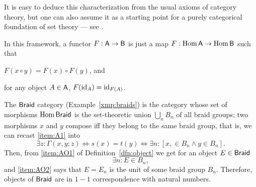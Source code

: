 It is easy to deduce this characterization from the usual axioms of
category theory, but one can also assume it as a starting point for a
purely categorical foundation of set theory --- see
\cite{lawvere;1965}. 

In this framework, a functor $F: \mathsf{A} \to \mathsf{B}$ is just a map $F:
\operatorname{Hom}\mathsf{A} \to \operatorname{Hom}\mathsf{B}$ such that
\begin{inparaenum}
\item $F(x \circ y) = F(x) \circ F(y)$, and
\item for any object $A \in \mathsf{A}$, $F(\operatorname{id}_A) = \operatorname{id}_{F(A)}$.
\end{inparaenum}

\begin{example}\label{xmp:braid-by-arrows}
  The $\mathsf{Braid}$ category (Example~\ref{xmp:braids}) is the category whose
  set of morphisms $\operatorname{Hom}\mathsf{Braid}$ is the set-theoretic union $\bigcup_n
  B_n$ of all braid groups; two morphisms $x$ and $y$ compose iff they
  belong to the same braid group, that is, we can recast \ref{item:A1}
  into
  \begin{equation*}
    \exists z: \Gamma(x,y;z) \Leftrightarrow s(x) = t(y) \Leftrightarrow \exists n: [x, \in B_n \land y \in B_n].
  \end{equation*}
  Then, from \ref{item:AO1} of Definition~\ref{dfn:object} we get for an object
  $E \in \mathsf{Braid}$
  \begin{equation*}
    \exists n: E \in B_n,
  \end{equation*}
  and \ref{item:AO2} says that $E = E_n$ is the unit of some braid group
  $B_n$. Therefore, objects of $\mathsf{Braid}$ are in $1-1$ correspondence
  with natural numbers.
\end{example}

